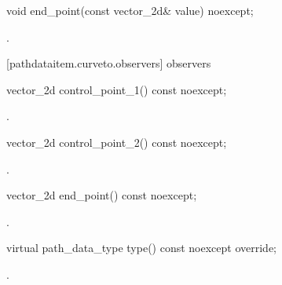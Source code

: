 \begin{itemdecl}
    void end_point(const vector_2d& value) noexcept;
\end{itemdecl}
\begin{itemdescr}
	\pnum
	\postconditions
	.
\end{itemdescr}

 [pathdataitem.curveto.observers]{ observers}

\begin{itemdecl}
    vector_2d control_point_1() const noexcept;
\end{itemdecl}
\begin{itemdescr}
	\pnum
	\returns
	.
\end{itemdescr}

\begin{itemdecl}
    vector_2d control_point_2() const noexcept;
\end{itemdecl}
\begin{itemdescr}
	\pnum
	\returns
	.
\end{itemdescr}

\begin{itemdecl}
    vector_2d end_point() const noexcept;
\end{itemdecl}
\begin{itemdescr}
	\pnum
	\returns
	.
\end{itemdescr}

\begin{itemdecl}
    virtual path_data_type type() const noexcept override;
\end{itemdecl}
\begin{itemdescr}
	\pnum
	\returns
	.
\end{itemdescr}
